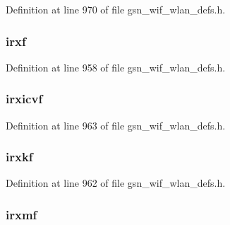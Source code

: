Definition at line 970 of file gsn\_\-wif\_\-wlan\_\-defs.h.

\hypertarget{a00398_abfd937522ca873e832344f1c0dc8884f}{
\subsubsection[{irxf}]{ {\bf irxf}}}
\label{a00398_abfd937522ca873e832344f1c0dc8884f}


Definition at line 958 of file gsn\_\-wif\_\-wlan\_\-defs.h.

\hypertarget{a00398_adaa4438825b74d78811988fb064b3cd8}{
\subsubsection[{irxicvf}]{ {\bf irxicvf}}}
\label{a00398_adaa4438825b74d78811988fb064b3cd8}


Definition at line 963 of file gsn\_\-wif\_\-wlan\_\-defs.h.

\hypertarget{a00398_a09ba086e0dfd0edff67a57a282df1762}{
\subsubsection[{irxkf}]{ {\bf irxkf}}}
\label{a00398_a09ba086e0dfd0edff67a57a282df1762}


Definition at line 962 of file gsn\_\-wif\_\-wlan\_\-defs.h.

\hypertarget{a00398_aa9d057005da78bcbddda3fabf920f0f6}{
\subsubsection[{irxmf}]{ {\bf irxmf}}}
\label{a00398_aa9d057005da78bcbddda3fabf920f0f6}


